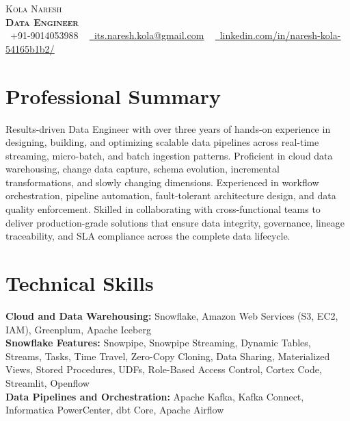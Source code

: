 \documentclass[letterpaper,11pt]{article}
\begin{document}
\begin{center}
    {\Huge \scshape Kola Naresh} \\ \vspace{4pt}
    \textbf{\Large \scshape Data Engineer} \\ \vspace{4pt}
    \small \faPhone\ +91-9014053988 ~
    \href{mailto:its.naresh.kola@gmail.com}{\faEnvelope\ \underline{its.naresh.kola@gmail.com}} ~
    \href{https://www.linkedin.com/in/naresh-kola-54165b1b2/}{\faLinkedin\ \underline{linkedin.com/in/naresh-kola-54165b1b2/}}
\end{center}

\section{Professional Summary}
Results-driven Data Engineer with over three years of hands-on experience in designing, building, and optimizing scalable data pipelines across real-time streaming, micro-batch, and batch ingestion patterns. Proficient in cloud data warehousing, change data capture, schema evolution, incremental transformations, and slowly changing dimensions. Experienced in workflow orchestration, pipeline automation, fault-tolerant architecture design, and data quality enforcement. Skilled in collaborating with cross-functional teams to deliver production-grade solutions that ensure data integrity, governance, lineage traceability, and SLA compliance across the complete data lifecycle.

\section{Technical Skills}

\textbf{Cloud and Data Warehousing:} Snowflake, Amazon Web Services (S3, EC2, IAM), Greenplum, Apache Iceberg \\

\textbf{Snowflake Features:} Snowpipe, Snowpipe Streaming, Dynamic Tables, Streams, Tasks, Time Travel, Zero-Copy Cloning, Data Sharing, Materialized Views, Stored Procedures, UDFs, Role-Based Access Control, Cortex Code, Streamlit, Openflow \\

\textbf{Data Pipelines and Orchestration:} Apache Kafka, Kafka Connect, Informatica PowerCenter, dbt Core, Apache Airflow \\
\end{document}
